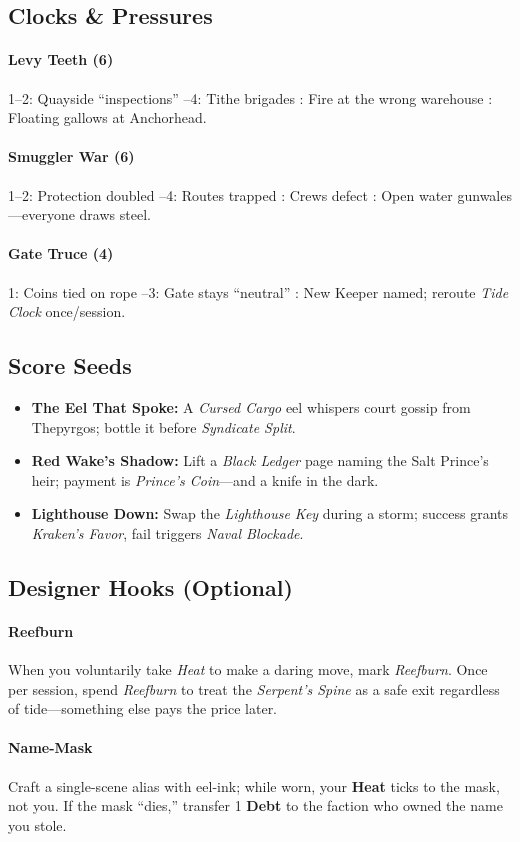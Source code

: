 \subsection*{Clocks \& Pressures}

\paragraph{Levy Teeth (6)}
1–2: Quayside “inspections” –4: Tithe brigades : Fire at the wrong warehouse : Floating gallows at Anchorhead.

\paragraph{Smuggler War (6)}
1–2: Protection doubled –4: Routes trapped : Crews defect : Open water gunwales—everyone draws steel.

\paragraph{Gate Truce (4)}
1: Coins tied on rope –3: Gate stays “neutral” : New Keeper named; reroute \emph{Tide Clock} once/session.

\subsection*{Score Seeds}

\begin{itemize}
\item \textbf{The Eel That Spoke:} A \emph{Cursed Cargo} eel whispers court gossip from Thepyrgos; bottle it before \emph{Syndicate Split}.
\item \textbf{Red Wake’s Shadow:} Lift a \emph{Black Ledger} page naming the Salt Prince’s heir; payment is \emph{Prince’s Coin}—and a knife in the dark.
\item \textbf{Lighthouse Down:} Swap the \emph{Lighthouse Key} during a storm; success grants \emph{Kraken’s Favor}, fail triggers \emph{Naval Blockade}.
\end{itemize}

\subsection*{Designer Hooks (Optional)}

\paragraph{Reefburn}
When you voluntarily take \emph{Heat} to make a daring move, mark \emph{Reefburn}. Once per session, spend \emph{Reefburn} to treat the \emph{Serpent’s Spine} as a safe exit regardless of tide—something else pays the price later.

\paragraph{Name-Mask}
Craft a single-scene alias with eel-ink; while worn, your \textbf{Heat} ticks to the mask, not you. If the mask “dies,” transfer 1 \textbf{Debt} to the faction who owned the name you stole.
